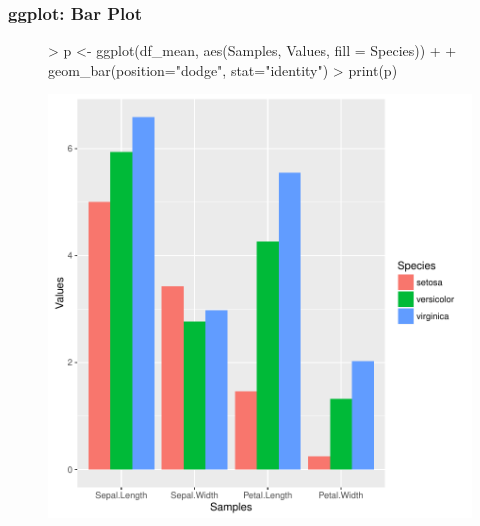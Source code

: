 \documentclass{beamer}
\begin{document}
\begin{frame}[containsverbatim]  
	\frametitle{ggplot: Bar Plot}
\scriptsize 
\begin{figure}
  \centering
\begin{Schunk}
\begin{Sinput}
> p <- ggplot(df_mean, aes(Samples, Values, fill = Species)) + 
+ 	    geom_bar(position="dodge", stat="identity")
> print(p) 
\end{Sinput}
\end{Schunk}
\includegraphics{fig--057}
\label{fig:qplotscatter}
\end{figure}
\end{frame}
\end{document}
